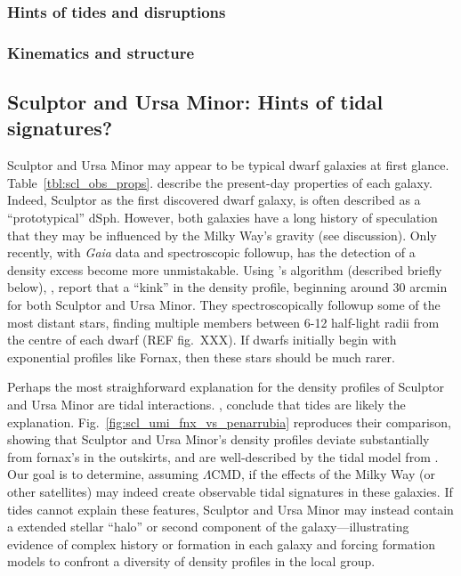 \subsubsection{Hints of tides and
disruptions}\label{hints-of-tides-and-disruptions}

\subsubsection{Kinematics and structure}\label{kinematics-and-structure}

\subsection{Sculptor and Ursa Minor: Hints of tidal
signatures?}\label{sculptor-and-ursa-minor-hints-of-tidal-signatures}

Sculptor and Ursa Minor may appear to be typical dwarf galaxies at first
glance. Table~\ref{tbl:scl_obs_props}. describe the present-day
properties of each galaxy. Indeed, Sculptor as the first discovered
dwarf galaxy, is often described as a ``prototypical'' dSph. However,
both galaxies have a long history of speculation that they may be
influenced by the Milky Way's gravity (see discussion). Only recently,
with \emph{Gaia} data and spectroscopic followup, has the detection of a
density excess become more unmistakable. Using \citet{jensen+2024}'s
algorithm (described briefly below), \citet{sestito+2023a},
\citet{sestito+2023b} report that a ``kink'' in the density profile,
beginning around 30 arcmin for both Sculptor and Ursa Minor. They
spectroscopically followup some of the most distant stars, finding
multiple members between 6-12 half-light radii from the centre of each
dwarf (REF fig.~XXX). If dwarfs initially begin with exponential
profiles like Fornax, then these stars should be much rarer.

Perhaps the most straighforward explanation for the density profiles of
Sculptor and Ursa Minor are tidal interactions. \citet{sestito+2023a},
\citet{sestito+2023b} conclude that tides are likely the explanation.
Fig.~\ref{fig:scl_umi_fnx_vs_penarrubia} reproduces their comparison,
showing that Sculptor and Ursa Minor's density profiles deviate
substantially from fornax's in the outskirts, and are well-described by
the tidal model from \citet{PNM2008}. Our goal is to determine, assuming
\(\Lambda\)CMD, if the effects of the Milky Way (or other satellites)
may indeed create observable tidal signatures in these galaxies. If
tides cannot explain these features, Sculptor and Ursa Minor may instead
contain a extended stellar ``halo'' or second component of the
galaxy---illustrating evidence of complex history or formation in each
galaxy and forcing formation models to confront a diversity of density
profiles in the local group.

